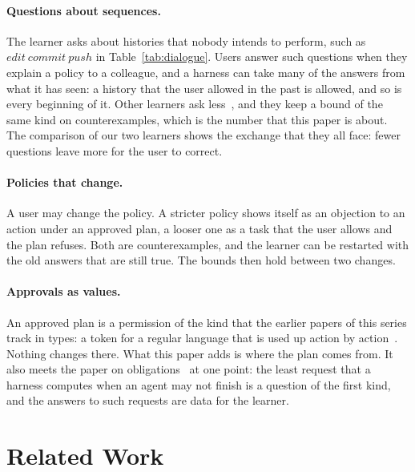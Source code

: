 \documentclass[acmsmall,nonacm,screen]{acmart}
\newcommand{\nm}[1]{\mathit{#1}}
\newcommand{\edit}{\nm{edit}}
\newcommand{\commit}{\nm{commit}}
\newcommand{\push}{\nm{push}}
\begin{document}
\paragraph{Questions about sequences.} The learner asks about histories that nobody
intends to perform, such as $\edit\ \commit\ \push$ in Table~\ref{tab:dialogue}. Users
answer such questions when they explain a policy to a colleague, and a harness can take
many of the answers from what it has seen: a history that the user allowed in the past is
allowed, and so is every beginning of it. Other learners ask
less~\cite{isberner2014,vaandrager2022}, and they keep a bound of the same kind on
counterexamples, which is the number that this paper is about. The comparison of our two learners shows the
exchange that they all face: fewer questions leave more for the user to correct.

\paragraph{Policies that change.} A user may change the policy. A stricter policy shows
itself as an objection to an action under an approved plan, a looser one as a task that the
user allows and the plan refuses. Both are counterexamples, and the learner can be restarted
with the old answers that are still true. The bounds then hold between two changes.

\paragraph{Approvals as values.} An approved plan is a permission of the kind that the
earlier papers of this series track in types: a token for a regular language that is used up
action by action~\cite{tpp11}. Nothing changes there. What this paper adds is where the plan
comes from. It also meets the paper on obligations~\cite{tpp12} at one point: the least
request that a harness computes when an agent may not finish is a question of the first
kind, and the answers to such requests are data for the learner.

\section{Related Work}
\label{sec:related}
\end{document}

